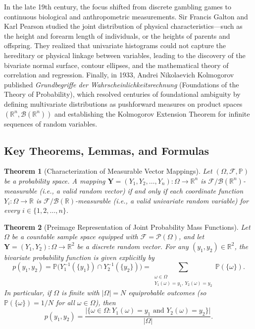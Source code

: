 \documentclass[11pt, letterpaper]{article}
\newtheorem{theorem}{Theorem}[section]
\theoremstyle{definition}
\theoremstyle{remark}
\newcommand{\R}{\mathbb{R}}
\newcommand{\Prob}{\mathbb{P}}
\newcommand{\F}{\mathcal{F}}
\begin{document}
In the late 19th century, the focus shifted from discrete gambling games to continuous biological and anthropometric measurements. Sir Francis Galton and Karl Pearson studied the joint distribution of physical characteristics—such as the height and forearm length of individuals, or the heights of parents and offspring. They realized that univariate histograms could not capture the hereditary or physical linkage between variables, leading to the discovery of the bivariate normal surface, contour ellipses, and the mathematical theory of correlation and regression. Finally, in 1933, Andrei Nikolaevich Kolmogorov published \emph{Grundbegriffe der Wahrscheinlichkeitsrechnung} (Foundations of the Theory of Probability), which resolved centuries of foundational ambiguity by defining multivariate distributions as pushforward measures on product spaces $(\R^n, \mathcal{B}(\R^n))$ and establishing the Kolmogorov Extension Theorem for infinite sequences of random variables.

\subsection{Key Theorems, Lemmas, and Formulas}

\begin{theorem}[Characterization of Measurable Vector Mappings]
\label{thm:vector_measurability}
Let $(\Omega, \F, \Prob)$ be a probability space. A mapping $\mathbf{Y} = (Y_1, Y_2, \dots, Y_n) : \Omega \to \R^n$ is $\F/\mathcal{B}(\R^n)$-measurable (i.e., a valid random vector) if and only if each coordinate function $Y_i : \Omega \to \R$ is $\F/\mathcal{B}(\R)$-measurable (i.e., a valid univariate random variable) for every $i \in \{1, 2, \dots, n\}$.
\end{theorem}

\begin{theorem}[Preimage Representation of Joint Probability Mass Functions]
\label{thm:preimage_pmf}
Let $\Omega$ be a countable sample space equipped with $\F = \mathcal{P}(\Omega)$, and let $\mathbf{Y} = (Y_1, Y_2) : \Omega \to \R^2$ be a discrete random vector. For any $(y_1, y_2) \in \R^2$, the bivariate probability function is given explicitly by
\[
p(y_1, y_2) = \Prob\bigl(Y_1^{-1}(\{y_1\}) \cap Y_2^{-1}(\{y_2\})\bigr) = \sum_{\substack{\omega \in \Omega \\ Y_1(\omega) = y_1,\ Y_2(\omega) = y_2}} \Prob(\{\omega\}).
\]
In particular, if $\Omega$ is finite with $|\Omega| = N$ equiprobable outcomes (so $\Prob(\{\omega\}) = 1/N$ for all $\omega \in \Omega$), then
\[
p(y_1, y_2) = \frac{\bigl|\{\omega \in \Omega : Y_1(\omega) = y_1 \text{ and } Y_2(\omega) = y_2\}\bigr|}{|\Omega|}.
\]
\end{theorem}
\end{document}
